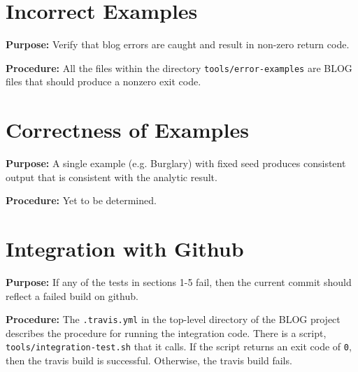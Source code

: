\documentclass[11pt]{article}
\begin{document}
\section{Incorrect Examples}

\textbf{Purpose:} Verify that blog errors are caught and result in non-zero return code.

\textbf{Procedure:} All the files within the directory \texttt{tools/error-examples} are BLOG files that should produce a nonzero exit code.

\section{Correctness of Examples}

\textbf{Purpose:} A single example (e.g. Burglary) with fixed seed produces consistent output that is consistent with the analytic result.

\textbf{Procedure:} Yet to be determined.	

\section{Integration with Github}

\textbf{Purpose:} If any of the tests in sections 1-5 fail, then the current commit should reflect a failed build on github.

\textbf{Procedure:} The \texttt{.travis.yml} in the top-level directory of the BLOG project describes the procedure for running the integration code. There is a script, \texttt{tools/integration-test.sh} that it calls. If the script returns an exit code of \texttt{0}, then the travis build is successful. Otherwise, the travis build fails.
\end{document}
